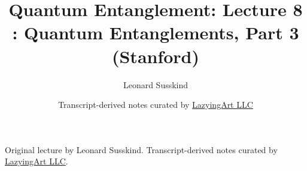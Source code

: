 \documentclass[11pt,oneside]{book}
\begin{document}
\frontmatter
\title{Quantum Entanglement: Lecture 8 : Quantum Entanglements, Part 3 (Stanford)}
\author{Leonard Susskind}
\date{Transcript-derived notes curated by \href{https://lazying.art}{LazyingArt LLC}}
\maketitle
\begin{center}
\small Original lecture by Leonard Susskind. Transcript-derived notes curated by \href{https://lazying.art}{LazyingArt LLC}.
\end{center}
\clearpage
\mainmatter

\end{document}
